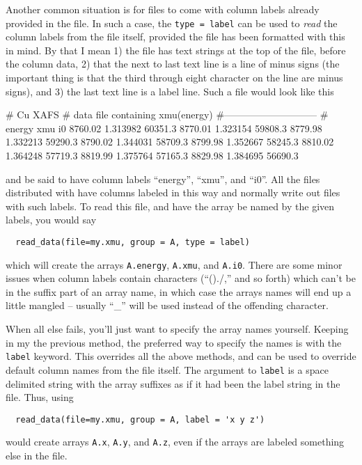 Another common situation is for files to come with column labels already
provided in the file.  In such a case, the {\tt{type = label}} can be
used to {\emph{read}} the column labels from the file itself, provided the
file has been formatted with this in mind.  By that I mean 1) the file
has text strings at the top of the file, before the column data, 2) that
the next to last text line is a line of minus signs (the important thing is
that the third through eight character on the line are minus signs), and 3)
the last text line is a label line.  Such a file would look like this
{}
{\small{
\begin{VerbSBox}
# Cu XAFS 
# data file containing xmu(energy)
#-----------------------------
#  energy  xmu    i0
 8760.02   1.313982  60351.3
 8770.01   1.323154  59808.3
 8779.98   1.332213  59290.3
 8790.02   1.344031  58709.3
 8799.98   1.352667  58245.3
 8810.02   1.364248  57719.3
 8819.99   1.375764  57165.3
 8829.98   1.384695  56690.3
\end{VerbSBox}
}}\noindent
and be said to have column labels ``energy'', ``xmu'', and ``i0''.  All the
files distributed with {\ifeffit} have columns labeled in this way and
{\ifeffit} normally write out files with such labels.  To read this file,
and have the array be named by the given labels, you would say
\begin{verbatim}
  read_data(file=my.xmu, group = A, type = label)
\end{verbatim}
\noindent
which will create the arrays {\texttt{A.energy}}, {\texttt{A.xmu}}, and
{\texttt{A.i0}}.  There are some minor issues when column labels contain
characters (``()./,'' and so forth) which can't be in the suffix part of an
array name, in which case the arrays names will end up a little mangled --
usually ``\_'' will be used instead of the offending character.

When all else fails, you'll just want to specify the array names yourself.
Keeping in my the previous method, the preferred way to specify the names
is with the {\tt{label}} keyword.  This overrides all the above methods,
and can be used to override default column names from the file itself.
The argument to {\tt{label}} is a space delimited string with the array
suffixes as if it had been the label string in the file.  Thus, using 
\begin{verbatim}
  read_data(file=my.xmu, group = A, label = 'x y z')
\end{verbatim}
\noindent
would create arrays {\texttt{A.x}}, {\texttt{A.y}}, and {\texttt{A.z}},
even if the arrays are labeled something else in the file.

